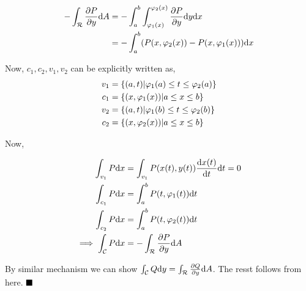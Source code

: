 \documentclass[../Analysis-3]{subfiles}
\begin{document}
\begin{align*}
    -\int_{\mathcal{R}} \pdv{P}{y} \dd A & = -\int_{a}^{b} \int_{\varphi_1(x)}^{\varphi_2(x)} \pdv{P}{y} \dd y \dd x \\
                                         & = - \int_{a}^{b} (P(x,\varphi_2(x))-P(x,\varphi_1(x))) \dd x              \\
\end{align*}

Now, $c_1,c_2,v_1,v_2$ can be explicitly written as,
\begin{align*}
    v_1 & = \qty{(a,t) | \varphi_1(a) \le t \le \varphi_2(a)} \\
    c_1 & = \qty{(x,\varphi_1(x)) | a \le x \le b}            \\
    v_2 & = \qty{(a,t) | \varphi_1(b) \le t \le \varphi_2(b)} \\
    c_2 & = \qty{(x,\varphi_2(x)) | a \le x \le b}
\end{align*}

Now,

\begin{align*}
    \int_{v_1} P \dd x                 & = \int_{v_1} P(x(t),y(t)) \dv{x(t)}{t} \dd t = 0 \\
    \int_{c_1} P \dd x                 & = \int_{a}^{b} P(t,\varphi_1(t)) \dd t           \\
    \int_{c_2} P \dd x                 & = \int_{a}^{b} P(t,\varphi_2(t)) \dd t           \\
    \implies \int_{\mathcal{C}} P\dd x & = -\int_{\mathcal{R}} \pdv{P}{y} \dd A
\end{align*}


By similar mechanism we can show $\int_{\mathcal{C}} Q \dd y = \int_{\mathcal{R}} \pdv{Q}{y} \dd A$. The resst follows from here. $\hfill \blacksquare$
\end{document}
